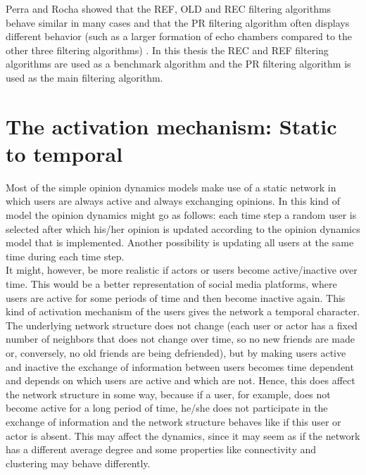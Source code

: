 \documentclass[11 pt , letterpaper , twoside , openright]{book}
\begin{document}
\newline
Perra and Rocha showed that the REF, OLD and REC filtering algorithms behave similar in many cases and that the PR filtering algorithm often displays different behavior (such as a larger formation of echo chambers compared to the other three filtering algorithms) \cite{Perra2019}. In this thesis the REC and REF filtering algorithms are used as a benchmark algorithm and the PR filtering algorithm is used as the main filtering algorithm.

\section{The activation mechanism: Static to temporal}\label{actMech}

Most of the simple opinion dynamics models make use of a static network in which users are always active and always exchanging opinions. In this kind of model the opinion dynamics might go as follows: each time step a random user is selected after which his/her opinion is updated according to the opinion dynamics model that is implemented. Another possibility is updating all users at the same time during each time step. \\
\newline
It might, however, be more realistic if actors or users become active/inactive over time. This would be a better representation of social media platforms, where users are active for some periods of time and then become inactive again. This kind of activation mechanism of the users gives the network a temporal character. The underlying network structure does not change (each user or actor has a fixed number of neighbors that does not change over time, so no new friends are made or, conversely, no old friends are being defriended), but by making users active and inactive the exchange of information between users becomes time dependent and depends on which users are active and which are not. Hence, this does affect the network structure in some way, because if a user, for example, does not become active for a long period of time, he/she does not participate in the exchange of information and the network structure behaves like if this user or actor is absent. This may affect the dynamics, since it may seem as if the network has a different average degree and some properties like connectivity and clustering may behave differently. \\
\newline
\end{document}
